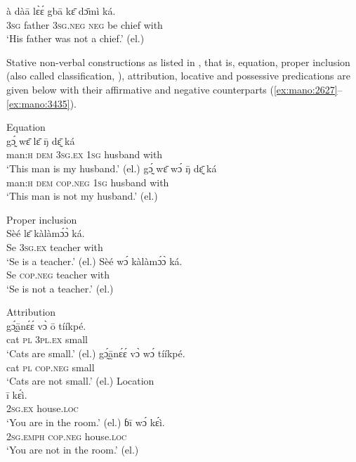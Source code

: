 \documentclass[output=paper,colorlinks,citecolor=brown]{langscibook}
\begin{document}
\ea\label{ex:mano:25}
    \gll à dàā lɛ̀ɛ́ gbā kɛ̄ dɔ̄mì ká.\\
         \textsc{3sg} father \textsc{3sg.neg} \textsc{neg} be  chief with\\
    \glt ‘His father was not a chief.’ (el.)
\z

Stative non-verbal constructions as listed in \citet{Veselinova2014}, that is, equation, proper inclusion (also called classification, \citealt{Haspelmath2021}), attribution, locative and possessive predications are given below with their affirmative and negative counterparts (\ref{ex:mano:2627}--\ref{ex:mano:3435}).

\ea\label{ex:mano:2627} Equation\\
    \ea\label{ex:mano:26}
        \gll gɔ̰́ wɛ̄ lɛ̄ ŋ̄ dɛ̰̄ ká  \\
             man:\textsc{h} \textsc{dem} \textsc{3sg.ex} \textsc{1sg} husband with  \\
        \glt ‘This man is my husband.’ (el.)
    \ex\label{ex:mano:27}
        \gll gɔ̰́ wɛ̄ wɔ́ ŋ̄ dɛ̰̄ ká  \\
             man\textsc{:h} \textsc{dem} \textsc{cop.neg} \textsc{1sg} husband with  \\
        \glt ‘This man is not my husband.’ (el.)
    \z
\z

\ea\label{ex:mano:2829} Proper inclusion  \\
    \ea\label{ex:mano:28} 
    \gll Sèé lɛ̄ kàlàmɔ́ɔ̀ ká.    \\
         Se \textsc{3sg.ex} teacher with    \\
    \glt ‘Se is a teacher.’ (el.)
    \ex\label{ex:mano:29}
    \gll Sèé wɔ́ kàlàmɔ́ɔ̀ ká.    \\
         Se \textsc{cop.neg} teacher with    \\
    \glt ‘Se is not a teacher.’ (el.)
\z\z 

\ea\label{ex:mano:3031} Attribution\\
\ea\label{ex:mano:30}
    \gll gɔ̰́ā̰nɛ́ɛ́ vɔ̀ ō tííkpé.    \\
         cat \textsc{pl} 3\textsc{pl.ex} small    \\
    \glt ‘Cats are small.’ (el.)
\ex\label{ex:mano:31}
    \gll gɔ̰́ā̰nɛ́ɛ́ vɔ̀ wɔ́ tííkpé.    \\
         cat \textsc{pl} \textsc{cop.neg} small    \\
    \glt ‘Cats are not small.’ (el.)
\z\z
\newpage
\ea\label{ex:mano:3233} Location\\
\ea\label{ex:mano:32}
    \gll ī kɛ́ì.     \\
         2\textsc{sg.ex} house.\textsc{loc}     \\
    \glt ‘You are in the room.’ (el.)
\ex\label{ex:mano:33}
    \gll ɓī wɔ́ kɛ́ì.     \\
         \textsc{2sg.emph} \textsc{cop.neg} house.\textsc{loc}     \\
    \glt ‘You are not in the room.’ (el.)
\z\z
\end{document}
